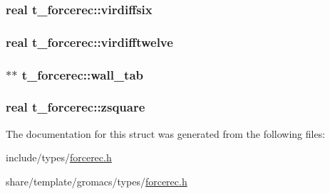 \hypertarget{structt__forcerec_a5d1a58de9b3141b7439f2964ea2cc851}{
\subsubsection[{virdiffsix}]{\setlength{\rightskip}{0pt plus 5cm}real {\bf t\-\_\-forcerec\-::virdiffsix}}}\label{structt__forcerec_a5d1a58de9b3141b7439f2964ea2cc851}
\hypertarget{structt__forcerec_a3abbdf13863649a87699c3207c95d996}{
\subsubsection[{virdifftwelve}]{\setlength{\rightskip}{0pt plus 5cm}real {\bf t\-\_\-forcerec\-::virdifftwelve}}}\label{structt__forcerec_a3abbdf13863649a87699c3207c95d996}
\hypertarget{structt__forcerec_a1416b8232abf92a77418d02e80eec50b}{
\subsubsection[{wall\-\_\-tab}]{ $\ast$$\ast$ {\bf t\-\_\-forcerec\-::wall\-\_\-tab}}}\label{structt__forcerec_a1416b8232abf92a77418d02e80eec50b}
\hypertarget{structt__forcerec_a535ef7521af195000cfa41f3f852a178}{
\subsubsection[{zsquare}]{\setlength{\rightskip}{0pt plus 5cm}real {\bf t\-\_\-forcerec\-::zsquare}}}\label{structt__forcerec_a535ef7521af195000cfa41f3f852a178}


\-The documentation for this struct was generated from the following files\-:\begin{DoxyCompactItemize}
\item 
include/types/\hyperlink{include_2types_2forcerec_8h}{forcerec.\-h}\item 
share/template/gromacs/types/\hyperlink{share_2template_2gromacs_2types_2forcerec_8h}{forcerec.\-h}\end{DoxyCompactItemize}

